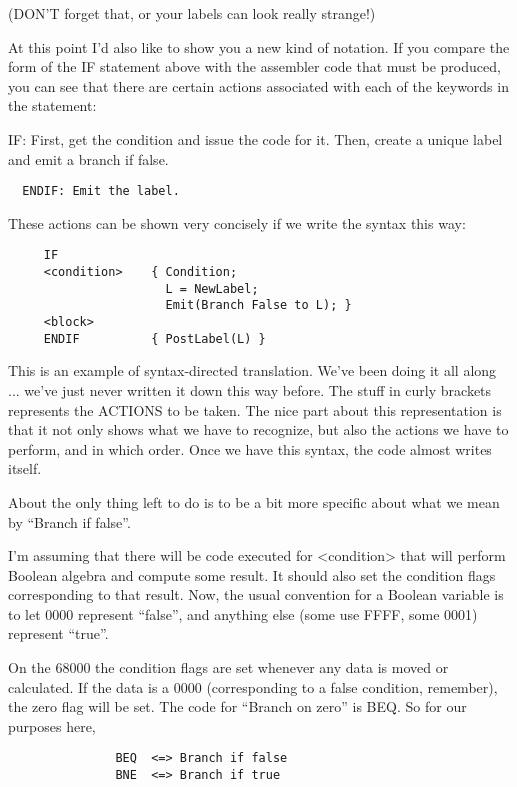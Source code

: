(DON'T forget that, or your labels can look really strange!)

At this point I'd also like to show you a  new  kind of notation. If  you  compare  the form of the IF statement above with the assembler code that must be produced, you can see  that  there  are certain  actions  associated  with each of the  keywords  in  the statement:

    IF:  First, get the condition and issue the code for it. Then, create a unique label and emit a branch if false.

\begin{verbatim}
  ENDIF: Emit the label.
\end{verbatim}

These actions can be shown very concisely if we write  the syntax this way:

\begin{verbatim}
     IF
     <condition>    { Condition;
                      L = NewLabel;
                      Emit(Branch False to L); }
     <block>
     ENDIF          { PostLabel(L) }
\end{verbatim}

This is an example  of  syntax-directed  translation. We've been doing it all along ... we've just never written it down  this way before. The stuff in curly brackets represents the ACTIONS to be taken. The nice part about this representation is  that  it  not only shows what  we  have  to  recognize, but also the actions we have to perform, and in which  order. Once we have this syntax, the code almost writes itself.

About  the  only thing left to do is to be a  bit  more  specific about what we mean by ``Branch if false''.

I'm assuming that there will  be  code  executed  for <condition> that  will  perform  Boolean algebra and compute some result. It should also set the condition flags corresponding to that result. Now, the usual convention  for  a Boolean variable is to let 0000 represent ``false'', and  anything  else (some use FFFF, some 0001) represent ``true''.

On the 68000  the  condition  flags  are set whenever any data is moved or calculated. If the  data  is a 0000 (corresponding to a false condition, remember), the zero flag will be set. The code for ``Branch on zero'' is BEQ. So for our purposes here,

\begin{verbatim}
               BEQ  <=> Branch if false
               BNE  <=> Branch if true
\end{verbatim}

